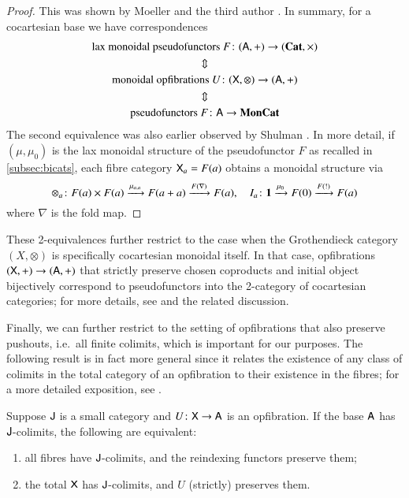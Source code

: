 \documentclass[reqno]{amsart}
\begin{document}
\begin{proof}
This was shown by Moeller and the third author \cite[Theorems~3.13\&4.1]{MV}. In summary, for a cocartesian base we have correspondences
\begin{gather}
\textrm{lax monoidal pseudofunctors }F\colon(\mathsf{A},+)\to(\mathbf{Cat},\times) \notag\\
\Updownarrow \notag\\
\textrm{monoidal opfibrations }U\colon(\mathsf{X},\otimes)\to(\mathsf{A},+) \label{monGroth}\\
\Updownarrow \notag\\
\textrm{pseudofunctors }F\colon\mathsf{A}\to\mathbf{MonCat} \notag
\end{gather}
The second equivalence was also earlier observed by Shulman \cite{Shulman2008}. In more detail, if $(\mu,\mu_0)$ is the lax monoidal structure of the pseudofunctor $F$ as recalled in \cref{subsec:bicats}, each fibre category $\mathsf{X}_a=F(a)$ obtains a monoidal structure via
\begin{equation}\label{eq:explicitstructure1}
\otimes_a\colon F(a)\times F(a)\xrightarrow{\mu_{a,a}}F(a+a)\xrightarrow{F(\nabla)}F(a),\quad
I_a\colon\mathbf{1}\xrightarrow{\mu_0}F(0)\xrightarrow{F(!)}F(a)
\end{equation}
where $\nabla$ is the fold map. 
\end{proof}

These 2-equivalences further restrict to the case when the Grothendieck category $(X,\otimes)$ is specifically cocartesian monoidal itself. In that case, opfibrations
$(\mathsf{X},+)\to(\mathsf{A},+)$ that strictly preserve chosen coproducts and initial object
bijectively correspond to pseudofunctors into the 2-category of cocartesian categories; for more details, see \cite[Corollary 4.7]{MV} and the related discussion.

Finally, we can further restrict to the setting of opfibrations that also preserve pushouts, i.e.\ all finite colimits, which is important for our purposes. The following result is in fact more general since it relates the existence of any class of colimits in the total category of an opfibration to their existence in the fibres; for a more detailed exposition, see \cite[Corollary~4.9]{Hermida1999}.

\begin{lem}\label{lem:fibrewiselimits}
Suppose $\mathsf{J}$ is a small category and $U\colon\mathsf{X}\to\mathsf{A}$ is an opfibration. If the base $\mathsf{A}$ has $\mathsf{J}$-colimits,
the following are equivalent:
\begin{enumerate}
 \item all fibres have $\mathsf{J}$-colimits, and the reindexing functors preserve them;
 \item the total $\mathsf{X}$ has $\mathsf{J}$-colimits, and $U$ (strictly) preserves them.
\end{enumerate}
\end{lem}
\end{document}
